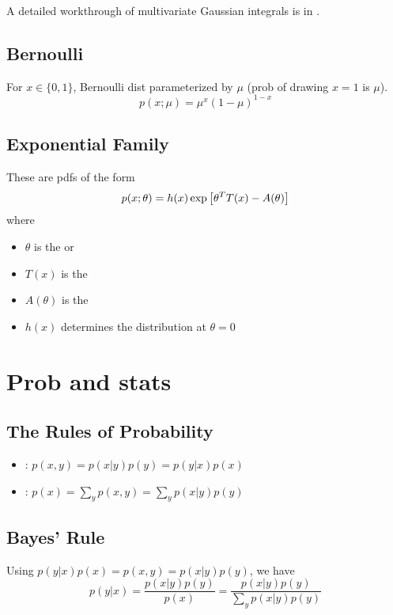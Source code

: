 \documentclass[11pt]{article}
\begin{document}
A detailed workthrough of multivariate Gaussian integrals is in
\href{http://vixra.org/abs/1404.0026}{}.

\subsection{Bernoulli}
For $x \in \{0, 1\}$, Bernoulli dist parameterized by $\mu$ (prob of drawing $x=1$ is
$\mu$).
\begin{equation}
  p(x; \mu) = \mu^x (1-\mu)^{1-x}
\end{equation}

\subsection{Exponential Family}
These are pdfs of the form
\begin{equation}
  p(x;\theta) = h(x) \exp \left[ \theta^T T(x) - A(\theta) \right]
\end{equation}
where
\begin{itemize}
  \item $\theta$ is the  or 
  \item $T(x)$ is the 
  \item $A(\theta)$ is the 
  \item $h(x)$ determines the distribution at $\theta = 0$
\end{itemize}


\section{Prob and stats}
\subsection{The Rules of Probability}
\begin{itemize}
  \item {}: $p(x, y) = p(x|y) p(y) = p(y|x) p(x)$
  \item {}: $p(x) = \sum\limits_y p(x, y) = \sum\limits_y p(x | y) p(y)$
\end{itemize}

\subsection{Bayes' Rule}
Using $p(y|x) p(x) = p(x,y) = p(x|y) p(y)$, we have
\begin{equation}
  p(y|x) = \frac{p(x|y) p(y)}{p(x)} = \frac{p(x|y) p(y)}{\sum\limits_y p(x|y) p(y)}
\end{equation}
\end{document}

